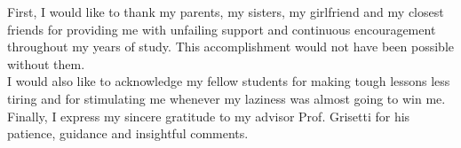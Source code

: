 \begin{acknowledgments}

First, I would like to thank my parents, my sisters, my girlfriend and my closest friends for providing me with unfailing support and continuous encouragement throughout my years of study. This accomplishment would not have been possible without them.\\

I would also like to acknowledge my fellow students for making tough lessons less tiring and for stimulating me whenever my laziness was almost going to win me.\\

Finally, I express my sincere gratitude to my advisor Prof. Grisetti for his patience, guidance and insightful comments.
\end{acknowledgments}
